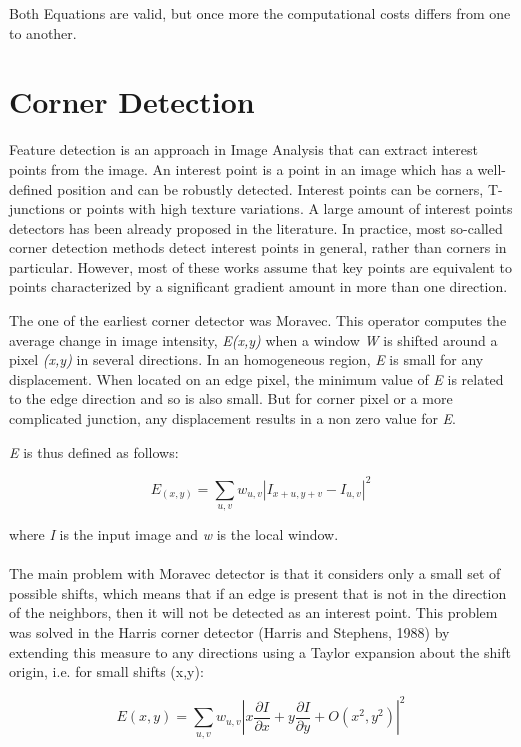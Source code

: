 \documentclass{article}
\begin{document}
Both Equations are valid, but once more the computational costs differs from one to another.

\section{Corner Detection}
	
	Feature detection is an approach in Image Analysis that can extract interest points from the image. An interest point is a point in an image which has a well-defined position and can be robustly detected. Interest points can be corners, T-junctions or points with high texture variations. A large amount of interest points detectors has been already proposed in the literature. In practice, most so-called corner detection methods detect interest points in general, rather than corners in particular. However, most of these works assume that key points are equivalent to points characterized by a significant gradient amount in more than one direction.

	The one of the earliest corner detector was Moravec. This operator computes the average change in image intensity, \textit{E(x,y)} when a window \textit{W} is shifted around a pixel \textit{(x,y)} in several directions. In an homogeneous region, \textit{E} is small for any displacement. When located on an edge pixel, the minimum value of \textit{E} is related to the edge direction and so is also small. But for corner pixel or a more complicated junction, any displacement results in a non zero value for \textit{E}.
	
	\textit{E} is thus defined as follows:

	\begin{equation}
	E_(x,y) = \sum_{u,v} w_{u,v} |I_{x+u,y+v} - I_{u,v}|^2
	\end{equation}

	where \textit{I} is the input image and \textit{w} is the local window.
	\\\\
	The main problem with Moravec detector is that it considers only a small set of possible shifts, which means that if an edge is present that is not in the direction of the neighbors, then it will not be detected as an interest point. This problem was solved in the Harris corner detector (Harris and Stephens, 1988) by extending this measure to any directions using a Taylor expansion about the shift origin, i.e. for small shifts (x,y):

	\begin{equation}
	E(x,y) = \sum_{u,v} w_{u,v}   |x \frac{\partial I}{\partial x} + y \frac{\partial I}{\partial y} + O(x^2,y^2)|^2
	\end{equation}
\end{document}
